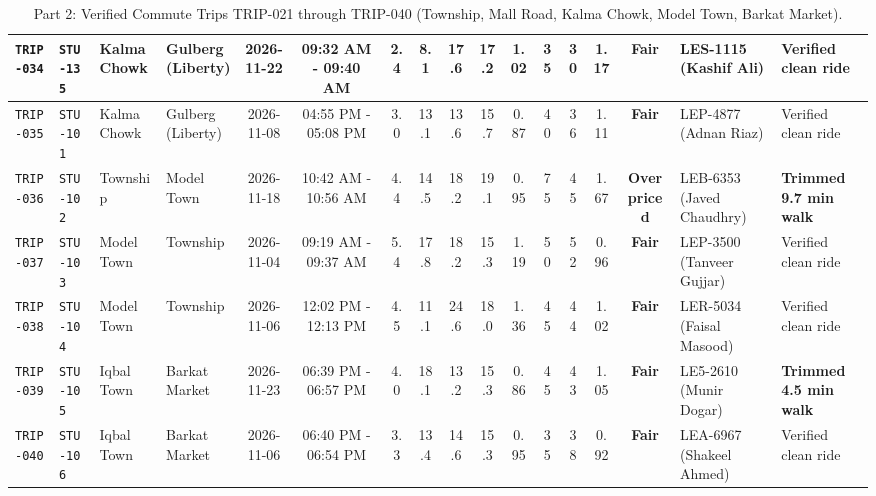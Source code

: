 \documentclass[9pt, a4paper, landscape]{article}
\begin{document}
\begin{table}[h!]
\begin{tabularx}{\textwidth}{|l|l|p{2.2cm}|p{2.3cm}|c|c|c|c|c|c|c|c|c|c|c|p{3.1cm}|X|}
\rowcolor{lightgray}\texttt{TRIP-034} & \texttt{STU-135} & Kalma Chowk & Gulberg (Liberty) & 2026-11-22 & 09:32 AM - 09:40 AM & 2.4 & 8.1 & 17.6 & 17.2 & 1.02 & 35 & 30 & 1.17 & \textcolor{accentteal}{\textbf{Fair}} & LES-1115 (Kashif Ali) & \textcolor{slate}{Verified clean ride} \\ \hline
\rowcolor{white}\texttt{TRIP-035} & \texttt{STU-101} & Kalma Chowk & Gulberg (Liberty) & 2026-11-08 & 04:55 PM - 05:08 PM & 3.0 & 13.1 & 13.6 & 15.7 & 0.87 & 40 & 36 & 1.11 & \textcolor{accentteal}{\textbf{Fair}} & LEP-4877 (Adnan Riaz) & \textcolor{slate}{Verified clean ride} \\ \hline
\rowcolor{lightgray}\texttt{TRIP-036} & \texttt{STU-102} & Township & Model Town & 2026-11-18 & 10:42 AM - 10:56 AM & 4.4 & 14.5 & 18.2 & 19.1 & 0.95 & 75 & 45 & 1.67 & \textcolor{accentred}{\textbf{Overpriced}} & LEB-6353 (Javed Chaudhry) & \textcolor{accentblue}{\textbf{Trimmed 9.7 min walk}} \\ \hline
\rowcolor{white}\texttt{TRIP-037} & \texttt{STU-103} & Model Town & Township & 2026-11-04 & 09:19 AM - 09:37 AM & 5.4 & 17.8 & 18.2 & 15.3 & 1.19 & 50 & 52 & 0.96 & \textcolor{accentteal}{\textbf{Fair}} & LEP-3500 (Tanveer Gujjar) & \textcolor{slate}{Verified clean ride} \\ \hline
\rowcolor{lightgray}\texttt{TRIP-038} & \texttt{STU-104} & Model Town & Township & 2026-11-06 & 12:02 PM - 12:13 PM & 4.5 & 11.1 & 24.6 & 18.0 & 1.36 & 45 & 44 & 1.02 & \textcolor{accentteal}{\textbf{Fair}} & LER-5034 (Faisal Masood) & \textcolor{slate}{Verified clean ride} \\ \hline
\rowcolor{white}\texttt{TRIP-039} & \texttt{STU-105} & Iqbal Town & Barkat Market & 2026-11-23 & 06:39 PM - 06:57 PM & 4.0 & 18.1 & 13.2 & 15.3 & 0.86 & 45 & 43 & 1.05 & \textcolor{accentteal}{\textbf{Fair}} & LE5-2610 (Munir Dogar) & \textcolor{accentblue}{\textbf{Trimmed 4.5 min walk}} \\ \hline
\rowcolor{lightgray}\texttt{TRIP-040} & \texttt{STU-106} & Iqbal Town & Barkat Market & 2026-11-06 & 06:40 PM - 06:54 PM & 3.3 & 13.4 & 14.6 & 15.3 & 0.95 & 35 & 38 & 0.92 & \textcolor{accentteal}{\textbf{Fair}} & LEA-6967 (Shakeel Ahmed) & \textcolor{slate}{Verified clean ride} \\ \hline
\end{tabularx}
\caption{\small Part 2: Verified Commute Trips TRIP-021 through TRIP-040 (Township, Mall Road, Kalma Chowk, Model Town, Barkat Market).}
\end{table}
\end{document}
